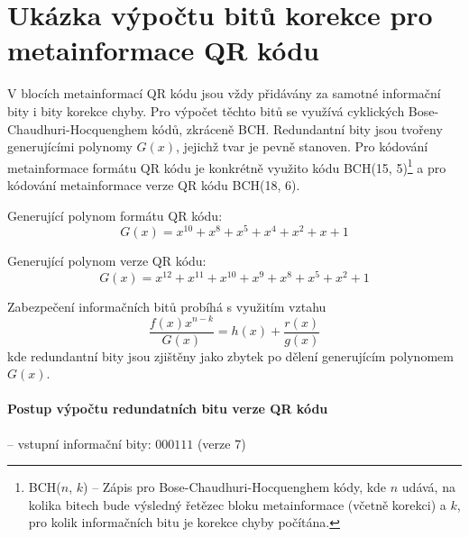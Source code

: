 \chapter{Ukázka výpočtu bitů korekce pro metainformace QR kódu}
\label{ukazkaVypoctuECCMetainformace}

V blocích metainformací QR kódu jsou vždy přidávány za samotné informační bity i
bity korekce chyby. Pro výpočet těchto bitů se využívá 
cyklických Bose-Chaudhuri-Hocquenghem kódů, zkráceně BCH. Redundantní bity
jsou tvořeny generujícími polynomy $G(x)$, jejichž tvar je pevně stanoven. Pro
kódování metainformace formátu QR kódu je konkrétně využito kódu BCH(15, 5)\footnote{BCH($n$, $k$) -- Zápis pro Bose-Chaudhuri-Hocquenghem kódy, kde $n$ udává, na kolika bitech bude výsledný řetězec bloku metainformace 
(včetně korekci) a $k$, pro kolik informačních bitu je korekce chyby počítána.} 
a pro kódování metainformace verze QR kódu BCH(18, 6). \cite{ISO180042006}

\bigskip \noindent Generující polynom formátu QR kódu:
\begin{equation}
G(x) = x^{10} + x^8 + x^5 + x^4 + x^2 + x + 1
\end{equation}

\noindent Generující polynom verze QR kódu:
\begin{equation}
G(x) = x^{12} + x^{11} + x^{10} + x^9 + x^8 + x^5 + x^2 + 1
\end{equation}

\bigskip \noindent Zabezpečení informačních bitů probíhá s využitím vztahu 
\begin{equation}
  \frac{f(x) x^{n-k}}{G(x)} = h(x) + \frac{r(x)}{g(x)}
\end{equation}
\noindent kde redundantní bity jsou zjištěny jako zbytek po dělení generujícím
polynomem $G(x)$. \cite{BCHCodesLiterature}

\subsubsection{Postup výpočtu redundatních bitu verze QR kódu}
\noindent -- vstupní informační bity: $000111$ (verze 7)

